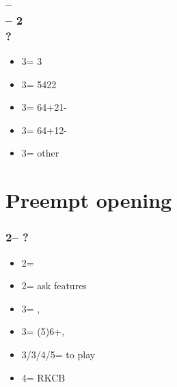 
\subsubsection*{ --  \\ 
                 -- 2\nt\\
                ?}
\begin{itemize}
    \item 3\clubs = 3
    \item 3\diams = 5422
    \item 3\hearts = 64+21-
    \item 3\spades = 64+12-
    \item 3\nt = other
\end{itemize}

\section{\texorpdfstring{Preempt opening}{preempts_v2}}\label{sec:preempts_v2}

\subsubsection*{2\hearts -- ?}
\begin{itemize}
    \item 2\spades = \lsf
    \item 2\nt = ask \nt features
    \item 3\clubs = \minor, \gf
    \item 3\diams = (5)6+\spades, \invp \vimp
    \item 3\hearts/3\nt/4\major/5\minor = to play
    \item 4\clubs = RKCB
\end{itemize}

